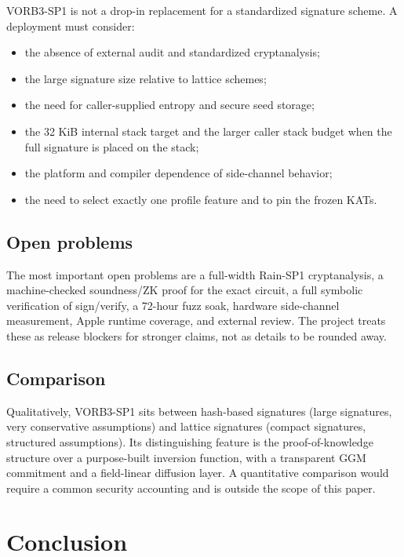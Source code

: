 \documentclass[11pt,a4paper]{article}
\begin{document}
VORB3-SP1 is not a drop-in replacement for a standardized signature scheme.
A deployment must consider:
\begin{itemize}
  \item the absence of external audit and standardized cryptanalysis;
  \item the large signature size relative to lattice schemes;
  \item the need for caller-supplied entropy and secure seed storage;
  \item the 32 KiB internal stack target and the larger caller stack budget
        when the full signature is placed on the stack;
  \item the platform and compiler dependence of side-channel behavior;
  \item the need to select exactly one profile feature and to pin the frozen
        KATs.
\end{itemize}

\subsection{Open problems}

The most important open problems are a full-width Rain-SP1 cryptanalysis, a
machine-checked soundness/ZK proof for the exact circuit, a full symbolic
verification of sign/verify, a 72-hour fuzz soak, hardware side-channel
measurement, Apple runtime coverage, and external review. The project treats
these as release blockers for stronger claims, not as details to be rounded
away.

\subsection{Comparison}

Qualitatively, VORB3-SP1 sits between hash-based signatures (large signatures,
very conservative assumptions) and lattice signatures (compact signatures,
structured assumptions). Its distinguishing feature is the proof-of-knowledge
structure over a purpose-built inversion function, with a transparent GGM
commitment and a field-linear diffusion layer. A quantitative comparison
would require a common security accounting and is outside the scope of this
paper.

\section{Conclusion}
\label{sec:conclusion}
\end{document}

